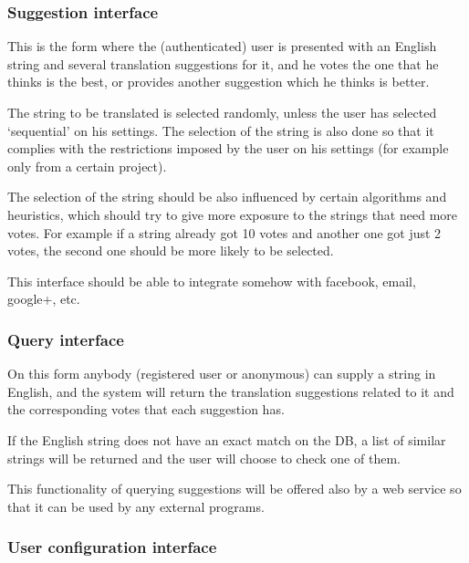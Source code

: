 \documentclass[11pt]{article}
\begin{document}
\subsubsection{Suggestion interface}
\label{sec-4.2.1}


    This is the form where the (authenticated) user is presented with
    an English string and several translation suggestions for it, and
    he votes the one that he thinks is the best, or provides another
    suggestion which he thinks is better.

    The string to be translated is selected randomly, unless the user
    has selected `sequential' on his settings. The selection of the
    string is also done so that it complies with the restrictions
    imposed by the user on his settings (for example only from a
    certain project).

    The selection of the string should be also influenced by certain
    algorithms and heuristics, which should try to give more exposure
    to the strings that need more votes. For example if a string
    already got 10 votes and another one got just 2 votes, the second
    one should be more likely to be selected.

    This interface should be able to integrate somehow with facebook,
    email, google+, etc.


\subsubsection{Query interface}
\label{sec-4.2.2}


    On this form anybody (registered user or anonymous) can supply a
    string in English, and the system will return the translation
    suggestions related to it and the corresponding votes that each
    suggestion has.

    If the English string does not have an exact match on the DB, a
    list of similar strings will be returned and the user will choose
    to check one of them.

    This functionality of querying suggestions will be offered also by
    a web service so that it can be used by any external programs.


\subsubsection{User configuration interface}
\label{sec-4.2.3}
\end{document}
